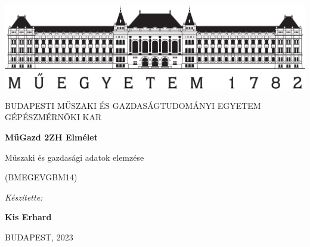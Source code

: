 \documentclass[11pt,a4paper]{article}
\begin{document}
\begin{titlepage}
    \centering
  
    \includegraphics[width=.8\textwidth]{bme_logo_nagy.jpg}
  
    \vspace{1em}
  
    {
      \large
      BUDAPESTI MŰSZAKI ÉS GAZDASÁGTUDOMÁNYI EGYETEM GÉPÉSZMÉRNÖKI KAR
    }
  
    \vspace{8em}
  
    {
      \Huge
      \textbf{MűGazd 2ZH Elmélet}
    }
  
    \vspace{10em}
  
    {
      \huge
      Műszaki és gazdasági adatok elemzése
  
      \vspace{.2em}
  
      \large
      (BMEGEVGBM14)
    }
  
    \vspace{4em}
  
    {
      \Large
      \textit{Készítette:}
  
      \vspace{.5em}
  
      \textbf{Kis Erhard}
    }
  
    \vspace{20em}
  
    {
      \large
      BUDAPEST, 2023
    }
  \end{titlepage}
\end{document}
